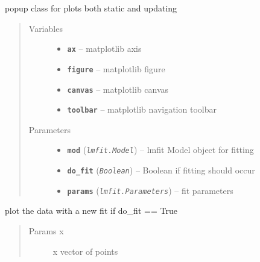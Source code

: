 \documentclass[letterpaper,10pt,english]{sphinxmanual}
\begin{document}
\begin{fulllineitems}
\label{PopPlot:Visualplotterwidget.PopPlot}
popup class for plots both static and updating
\begin{quote}\begin{description}
\item[{Variables}] \leavevmode\begin{itemize}
\item {} 
\textbf{\texttt{ax}} -- matplotlib axis

\item {} 
\textbf{\texttt{figure}} -- matplotlib figure

\item {} 
\textbf{\texttt{canvas}} -- matplotlib canvas

\item {} 
\textbf{\texttt{toolbar}} -- matplotlib navigation toolbar

\end{itemize}

\item[{Parameters}] \leavevmode\begin{itemize}
\item {} 
\textbf{\texttt{mod}} (\emph{\texttt{lmfit.Model}}) -- lmfit Model object for fitting

\item {} 
\textbf{\texttt{do\_fit}} (\emph{\texttt{Boolean}}) -- Boolean if fitting should occur

\item {} 
\textbf{\texttt{params}} (\emph{\texttt{lmfit.Parameters}}) -- fit parameters

\end{itemize}

\end{description}\end{quote}

\begin{fulllineitems}
\label{PopPlot:Visualplotterwidget.PopPlot.plot}
plot the data with a new fit if do\_fit == True
\begin{quote}\begin{description}
\item[{Params x}] \leavevmode
x vector of points


\end{description}
\end{quote}
\end{fulllineitems}
\end{fulllineitems}
\end{document}
